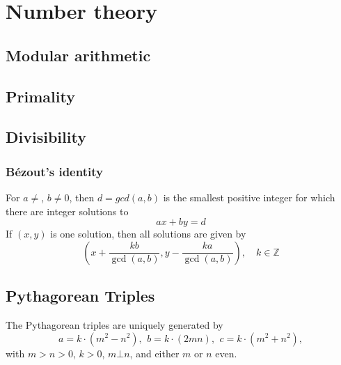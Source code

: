 \chapter{Number theory}

\section{Modular arithmetic}

\section{Primality}

\section{Divisibility}

\subsection{Bézout's identity}
For $a \neq $, $b \neq 0$, then $d=gcd(a,b)$ is the smallest positive integer
for which there are integer solutions to $$ax+by=d$$ If $(x,y)$ is one
solution, then all solutions are given by $$\left(x+\frac{kb}{\gcd(a,b)},
   y-\frac{ka}{\gcd(a,b)}\right), \quad k\in\mathbb{Z}$$



\section{Pythagorean Triples}
The Pythagorean triples are uniquely generated by
\[ a=k\cdot (m^{2}-n^{2}),\ \,b=k\cdot (2mn),\ \,c=k\cdot (m^{2}+n^{2}), \]
with $m > n > 0$, $k > 0$, $m \bot n$, and either $m$ or $n$ even.

